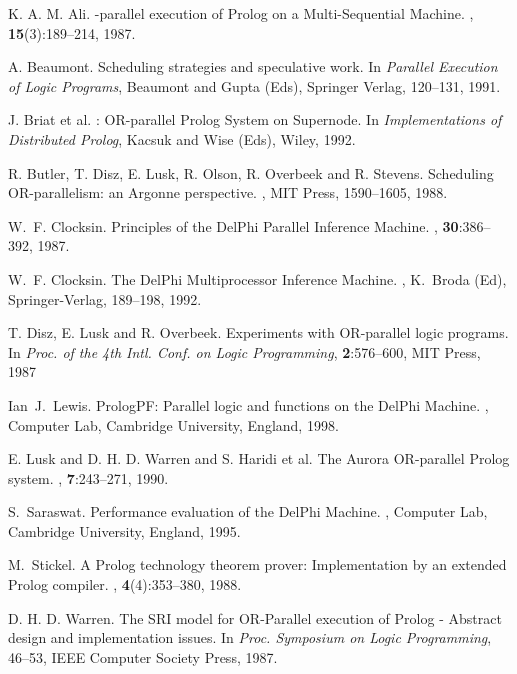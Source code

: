 \documentclass[a4paper,11pt,twoside]{article}
\begin{document}
\begin{thebibliography}{99} %

K. A. M. Ali.
-parallel execution of {P}rolog on a Multi-Sequential Machine.
, {\bf 15}(3):189--214, 1987.

A. Beaumont.
\newblock Scheduling strategies and speculative work.
\newblock In {\it Parallel Execution of Logic Programs}, Beaumont and Gupta (Eds),
          Springer Verlag, 120--131, 1991.

J. Briat et al.
: {OR}-parallel {P}rolog System on Supernode.
\newblock In {\it Implementations of Distributed {P}rolog}, Kacsuk and Wise (Eds),
           Wiley, 1992.

R. Butler, T. Disz, E. Lusk, R. Olson, R. Overbeek and R. Stevens.
\newblock Scheduling {OR}-parallelism: an {A}rgonne perspective.
, 
          MIT Press, 1590--1605, 1988.

W.~F. Clocksin.
\newblock Principles of the {D}el{P}hi Parallel Inference Machine.
, {\bf 30}:386--392, 1987.

W.~F. Clocksin.
\newblock The {D}el{P}hi Multiprocessor Inference Machine.
, K.~Broda (Ed),
           Springer-Verlag, 189--198, 1992.

T. Disz, E. Lusk and R. Overbeek.
\newblock Experiments with {OR}-parallel logic programs.
\newblock In {\it Proc. of the 4th Intl. Conf. on Logic Programming},
          {\bf 2}:576--600, MIT Press, 1987
	
Ian~J.~Lewis.
\newblock PrologPF: Parallel logic and functions on the {D}elPhi {M}achine.
, Computer Lab, Cambridge University, England, 1998. 

E. Lusk and D. H. D. Warren and S. Haridi et al.
\newblock The {A}urora OR-parallel {P}rolog system.
, {\bf 7}:243--271, 1990.
	
S.~Saraswat.
\newblock Performance evaluation of the DelPhi Machine.
, Computer Lab, Cambridge University, England, 1995.

M.~Stickel.
\newblock A {P}rolog technology theorem prover:
          {I}mplementation by an extended {P}rolog
          compiler.
, {\bf 4}(4):353--380, 1988.
	
D. H. D. Warren.
\newblock The {SRI} model for OR-Parallel execution of {P}rolog - Abstract
          design and implementation issues.
\newblock In {\it Proc. Symposium on Logic Programming}, 46--53,
          IEEE Computer Society Press, 1987.

\end{thebibliography}
\end{document}
